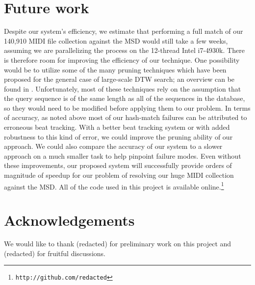 \documentclass{article}
\begin{document}
\section{Future work}

Despite our system's efficiency, we estimate that performing a full match of our 140,910 MIDI file collection against the MSD would still take a few weeks, assuming we are parallelizing the process on the 12-thread Intel i7-4930k.
There is therefore room for improving the efficiency of our technique.
One possibility would be to utilize some of the many pruning techniques which have been proposed for the general case of large-scale DTW search; an overview can be found in \cite{rakthanmanon2012searching}.
Unfortunately, most of these techniques rely on the assumption that the query sequence is of the same length as all of the sequences in the database, so they would need to be modified before applying them to our problem.
In terms of accuracy, as noted above most of our hash-match failures can be attributed to erroneous beat tracking.
With a better beat tracking system or with added robustness to this kind of error, we could improve the pruning ability of our approach.
We could also compare the accuracy of our system to a slower approach on a much smaller task to help pinpoint failure modes.
Even without these improvements, our proposed system will successfully provide orders of magnitude of speedup for our problem of resolving our huge MIDI collection against the MSD.
All of the code used in this project is available online.\footnote{\texttt{http://github.com/redacted}}

\section{Acknowledgements}

We would like to thank
(redacted) for preliminary work on this project and
(redacted) for fruitful discussions.


\end{document}
